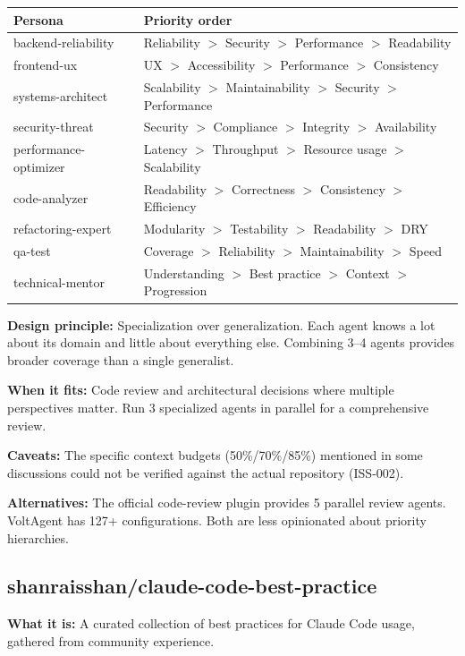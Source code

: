 \documentclass[11pt,a4paper]{article}
\begin{document}
\begin{tabularx}{\textwidth}{l X}
\toprule
\textbf{Persona} & \textbf{Priority order} \\
\midrule
backend-reliability & Reliability $>$ Security $>$ Performance $>$ Readability \\
frontend-ux & UX $>$ Accessibility $>$ Performance $>$ Consistency \\
systems-architect & Scalability $>$ Maintainability $>$ Security $>$ Performance \\
security-threat & Security $>$ Compliance $>$ Integrity $>$ Availability \\
performance-optimizer & Latency $>$ Throughput $>$ Resource usage $>$ Scalability \\
code-analyzer & Readability $>$ Correctness $>$ Consistency $>$ Efficiency \\
refactoring-expert & Modularity $>$ Testability $>$ Readability $>$ DRY \\
qa-test & Coverage $>$ Reliability $>$ Maintainability $>$ Speed \\
technical-mentor & Understanding $>$ Best practice $>$ Context $>$ Progression \\
\bottomrule
\end{tabularx}

\textbf{Design principle:} Specialization over generalization. Each agent knows a lot about its domain and little about everything else. Combining 3--4 agents provides broader coverage than a single generalist.

\textbf{When it fits:} Code review and architectural decisions where multiple perspectives matter. Run 3 specialized agents in parallel for a comprehensive review.

\textbf{Caveats:} The specific context budgets (50\%/70\%/85\%) mentioned in some discussions could not be verified against the actual repository (ISS-002).

\textbf{Alternatives:} The official code-review plugin provides 5 parallel review agents. VoltAgent has 127+ configurations. Both are less opinionated about priority hierarchies.

\subsection{shanraisshan/claude-code-best-practice}

\textbf{What it is:} A curated collection of best practices for Claude Code usage, gathered from community experience.
\end{document}
